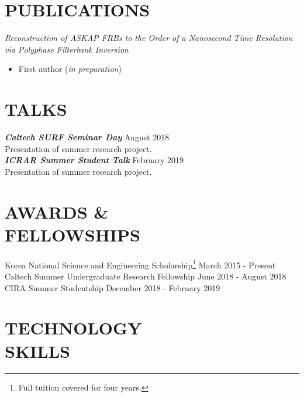 \documentclass[margin, 10pt]{res} %
\begin{document}
\begin{resume}
\section{PUBLICATIONS}
{\sl Reconstruction of ASKAP FRBs to the Order of a Nanosecond Time Resolution\\ via Polyphase Filterbank Inversion}
\begin{itemize}
\item[] First author ({\sl in preparation})
\end{itemize}

\section{TALKS}

{\bf \sl Caltech SURF Seminar Day} \hfill{August 2018}\\
Presentation of summer research project. \\
{\bf \sl ICRAR Summer Student Talk} \hfill{February 2019}\\
Presentation of summer research project.


\section{AWARDS \& \\ FELLOWSHIPS}

Korea National Science and Engineering Scholarship\footnote{Full tuition covered for four years.} \hfill March 2015 - Present\\
Caltech Summer Undergraduate Research Fellowship \hfill June 2018 - August 2018\\
CIRA Summer Studentship \hfill December 2018 - February 2019\\



\section{TECHNOLOGY \\ SKILLS} 


\end{resume}
\end{document}
